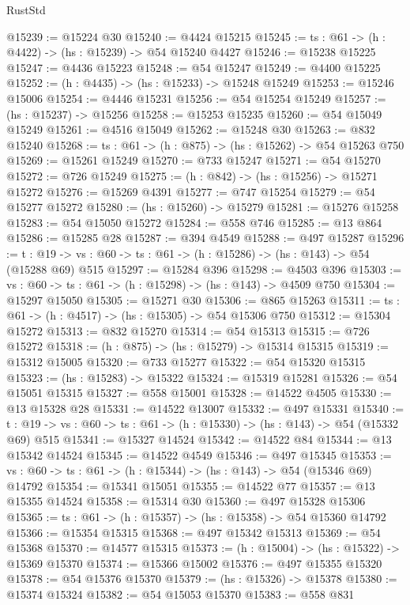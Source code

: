 \begin{lexlean}{RustStd}
\begin{coremodule}
@15239 := @15224 @30
@15240 := @4424 @15215
@15245 := {ts : @61} -> (h : @4422) -> (hs : @15239) -> @54 @15240 @4427
@15246 := @15238 @15225
@15247 := @4436 @15223
@15248 := @54 @15247
@15249 := @4400 @15225
@15252 := (h : @4435) -> (hs : @15233) -> @15248 @15249
@15253 := @15246 @15006
@15254 := @4446 @15231
@15256 := @54 @15254 @15249
@15257 := (hs : @15237) -> @15256
@15258 := @15253 @15235
@15260 := @54 @15049 @15249
@15261 := @4516 @15049
@15262 := @15248 @30
@15263 := @832 @15240
@15268 := {ts : @61} -> (h : @875) -> (hs : @15262) -> @54 @15263 @750
@15269 := @15261 @15249
@15270 := @733 @15247
@15271 := @54 @15270
@15272 := @726 @15249
@15275 := (h : @842) -> (hs : @15256) -> @15271 @15272
@15276 := @15269 @4391
@15277 := @747 @15254
@15279 := @54 @15277 @15272
@15280 := (hs : @15260) -> @15279
@15281 := @15276 @15258
@15283 := @54 @15050 @15272
@15284 := @558 @746
@15285 := @13 @864
@15286 := @15285 @28
@15287 := @394 @4549
@15288 := @497 @15287
@15296 := {t : @19} ->
  {vs : @60} -> {ts : @61} -> (h : @15286) -> (hs : @143) -> @54 (@15288 @69) @515
@15297 := @15284 @396
@15298 := @4503 @396
@15303 := {vs : @60} -> {ts : @61} -> (h : @15298) -> (hs : @143) -> @4509 @750
@15304 := @15297 @15050
@15305 := @15271 @30
@15306 := @865 @15263
@15311 := {ts : @61} -> (h : @4517) -> (hs : @15305) -> @54 @15306 @750
@15312 := @15304 @15272
@15313 := @832 @15270
@15314 := @54 @15313
@15315 := @726 @15272
@15318 := (h : @875) -> (hs : @15279) -> @15314 @15315
@15319 := @15312 @15005
@15320 := @733 @15277
@15322 := @54 @15320 @15315
@15323 := (hs : @15283) -> @15322
@15324 := @15319 @15281
@15326 := @54 @15051 @15315
@15327 := @558 @15001
@15328 := @14522 @4505
@15330 := @13 @15328 @28
@15331 := @14522 @13007
@15332 := @497 @15331
@15340 := {t : @19} ->
  {vs : @60} -> {ts : @61} -> (h : @15330) -> (hs : @143) -> @54 (@15332 @69) @515
@15341 := @15327 @14524
@15342 := @14522 @84
@15344 := @13 @15342 @14524
@15345 := @14522 @4549
@15346 := @497 @15345
@15353 := {vs : @60} -> {ts : @61} -> (h : @15344) -> (hs : @143) -> @54 (@15346 @69) @14792
@15354 := @15341 @15051
@15355 := @14522 @77
@15357 := @13 @15355 @14524
@15358 := @15314 @30
@15360 := @497 @15328 @15306
@15365 := {ts : @61} -> (h : @15357) -> (hs : @15358) -> @54 @15360 @14792
@15366 := @15354 @15315
@15368 := @497 @15342 @15313
@15369 := @54 @15368
@15370 := @14577 @15315
@15373 := (h : @15004) -> (hs : @15322) -> @15369 @15370
@15374 := @15366 @15002
@15376 := @497 @15355 @15320
@15378 := @54 @15376 @15370
@15379 := (hs : @15326) -> @15378
@15380 := @15374 @15324
@15382 := @54 @15053 @15370
@15383 := @558 @831

\end{coremodule}
\end{lexlean}
